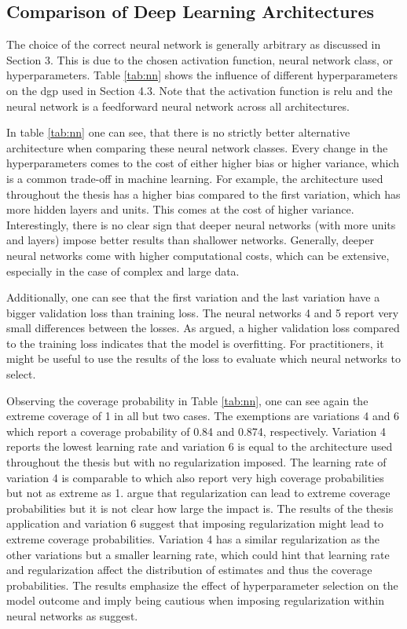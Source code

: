 \subsection{Comparison of Deep Learning Architectures}

The choice of the correct neural network is generally arbitrary as discussed in Section 3.
This is due to the chosen activation function, neural network class, or hyperparameters.
Table \ref{tab:nn} shows the influence of different hyperparameters on the \ac{dgp} used in Section 4.3.
Note that the activation function is \ac{relu} and the neural network is a feedforward neural network across all architectures.

In table \ref{tab:nn} one can see, that there is no strictly better alternative architecture when comparing these neural network classes.
Every change in the hyperparameters comes to the cost of either higher bias or higher variance, which is a common trade-off in machine learning.
For example, the architecture used throughout the thesis has a higher bias compared to the first variation, which has more hidden layers and units.
This comes at the cost of higher variance.
Interestingly, there is no clear sign that deeper neural networks (with more units and layers) impose better results than shallower networks.
Generally, deeper neural networks come with higher computational costs, which can be extensive, especially in the case of complex and large data.

Additionally, one can see that the first variation and the last variation have a bigger validation loss than training loss.
The neural networks 4 and 5 report very small differences between the losses.
As argued, a higher validation loss compared to the training loss indicates that the model is overfitting.
For practitioners, it might be useful to use the results of the loss to evaluate which neural networks to select.



Observing the coverage probability in Table \ref{tab:nn}, one can see again the extreme coverage of 1 in all but two cases.
The exemptions are variations 4 and 6 which report a coverage probability of 0.84 and 0.874, respectively.
Variation 4 reports the lowest learning rate and variation 6 is equal to the architecture used throughout the thesis but with no regularization imposed.
The learning rate of variation 4 is comparable to \citet{farrellDeepNeuralNetworks2021} which also report very high coverage probabilities but not as extreme as 1.
\citet{farrellDeepNeuralNetworks2021} argue that regularization can lead to extreme coverage probabilities but it is not clear how large the impact is.
The results of the thesis application and variation 6 suggest that imposing regularization might lead to extreme coverage probabilities.
Variation 4 has a similar regularization as the other variations but a smaller learning rate, which could hint that learning rate and regularization affect the distribution of estimates and thus the coverage probabilities.
The results emphasize the effect of hyperparameter selection on the model outcome and imply being cautious when imposing regularization within neural networks as \citet{farrellDeepNeuralNetworks2021} suggest.

